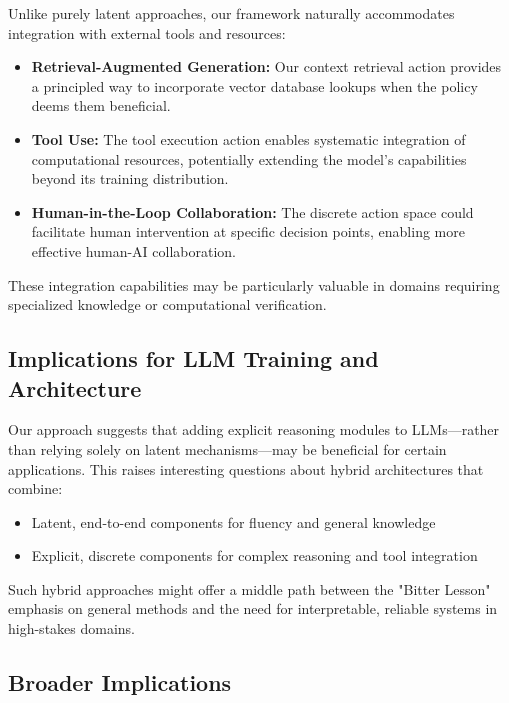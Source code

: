 \documentclass[10pt,journal,compsoc]{IEEEtran}
\begin{document}
Unlike purely latent approaches, our framework naturally accommodates integration with external tools and resources:

\begin{itemize}
\item \textbf{Retrieval-Augmented Generation:} Our context retrieval action provides a principled way to incorporate vector database lookups when the policy deems them beneficial.

\item \textbf{Tool Use:} The tool execution action enables systematic integration of computational resources, potentially extending the model's capabilities beyond its training distribution.

\item \textbf{Human-in-the-Loop Collaboration:} The discrete action space could facilitate human intervention at specific decision points, enabling more effective human-AI collaboration.
\end{itemize}

These integration capabilities may be particularly valuable in domains requiring specialized knowledge or computational verification.

\subsection{Implications for LLM Training and Architecture}

Our approach suggests that adding explicit reasoning modules to LLMs—rather than relying solely on latent mechanisms—may be beneficial for certain applications. This raises interesting questions about hybrid architectures that combine:

\begin{itemize}
\item Latent, end-to-end components for fluency and general knowledge
\item Explicit, discrete components for complex reasoning and tool integration
\end{itemize}

Such hybrid approaches might offer a middle path between the "Bitter Lesson" emphasis on general methods and the need for interpretable, reliable systems in high-stakes domains.

\subsection{Broader Implications}
\end{document}
